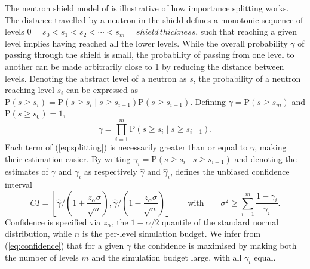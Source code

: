 \documentclass{llncs}
\begin{document}
The neutron shield model of \cite{Kahn1950,KahnHarris1951} is illustrative
of how importance splitting works. The distance travelled by a neutron
in the shield defines a monotonic sequence of levels $0=s_{0}<s_{1}<s_{2}<\cdots<s_{m}=\mathit{shield\,thickness}$,
such that reaching a given level implies having reached all the lower
levels. While the overall probability $\gamma$ of passing through
the shield is small, the probability of passing from one level to
another can be made arbitrarily close to 1 by reducing the distance
between levels. Denoting the abstract level of a neutron as $s$,
the probability of a neutron reaching level $s_{i}$ can be expressed
as $\mathrm{P}(s\geq s_{i})=\mathrm{P}(s\geq s_{i}\mid s\geq s_{i-1})\mathrm{P}(s\geq s_{i-1})$.
Defining $\gamma=\mathrm{P}(s\geq s_{m})$ and $\mathrm{P}(s\geq s_{0})=1$,
\begin{equation}
\gamma=\prod_{i=1}^{m}\mathrm{P}(s\geq s_{i}\mid s\geq s_{i-1}).\label{eq:splitting}
\end{equation}
Each term of (\ref{eq:splitting}) is necessarily greater than or
equal to $\gamma$, making their estimation easier. By writing $\gamma_{i}=\mathrm{P}(s\geq s_{i}\mid s\geq s_{i-1})$
and denoting the estimates of $\gamma$ and $\gamma_{i}$ as respectively
$\hat{\gamma}$ and $\hat{\gamma}_{i}$, \cite{JegourelLegaySedwards2013}
defines the unbiased confidence interval 
\begin{equation}
\mathit{CI}=\left[\hat{\gamma}/\left(1+\frac{z_{\alpha}\sigma}{\sqrt{n}}\right),\hat{\gamma}/\left(1-\frac{z_{\alpha}\sigma}{\sqrt{n}}\right)\right]\qquad\textrm{with}\qquad\sigma^{2}\geq\sum_{i=1}^{m}\frac{1-\gamma_{i}}{\gamma_{i}}.\label{eq:confidence}
\end{equation}
Confidence is specified via $z_{\alpha}$, the $1-\alpha/2$ quantile
of the standard normal distribution, while $n$ is the per-level simulation
budget. We infer from (\ref{eq:confidence}) that for a given $\gamma$
the confidence is maximised by making both the number of levels $m$
and the simulation budget large, with all $\gamma_{i}$ equal.
\end{document}
